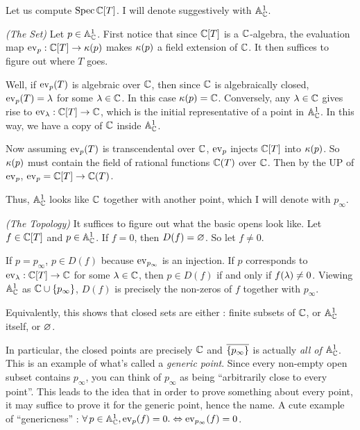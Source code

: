 \begin{eg}
  
  Let us compute $\operatorname{Spec} \mathbb{C}[T]$.
  I will denote suggestively with $\mathbb{A}^1_{\mathbb{C}}$.

  \textit{(The Set)}
  Let $p \in \mathbb{A}^1_{\mathbb{C}}$.
  First notice that since $\mathbb{C}[T]$ is a $\mathbb{C}$-algebra,
  the evaluation map $\operatorname{ev}_p : \mathbb{C}[T] \to \kappa(p)$
  makes $\kappa(p)$ a field extension of $\mathbb{C}$.
  It then suffices to figure out where $T$ goes. 

  Well, if $\operatorname{ev}_p(T)$ is algebraic over $\mathbb{C}$,
  then since $\mathbb{C}$ is algebraically closed, 
  $\operatorname{ev}_p(T) = \lambda$ for some $\lambda \in \mathbb{C}$.
  In this case $\kappa(p) = \mathbb{C}$.
  Conversely, any $\lambda \in \mathbb{C}$ gives rise to 
  $\operatorname{ev}_\lambda : \mathbb{C}[T] \to \mathbb{C}$, which is the initial representative of 
  a point in $\mathbb{A}^1_{\mathbb{C}}$.
  In this way, we have a copy of $\mathbb{C}$ inside $\mathbb{A}^1_{\mathbb{C}}$.

  Now assuming $\operatorname{ev}_p(T)$ is transcendental over $\mathbb{C}$,
  $\operatorname{ev}_p$ injects $\mathbb{C}[T]$ into $\kappa(p)$.
  So $\kappa(p)$ must contain the field of rational functions $\mathbb{C}(T)$ over $\mathbb{C}$.
  Then by the UP of $\operatorname{ev}_p$, $\operatorname{ev}_p = \mathbb{C}[T] \to \mathbb{C}(T)$.

  Thus, $\mathbb{A}^1_{\mathbb{C}}$ looks like 
  $\mathbb{C}$ together with another point, which I will denote with $p_\infty$.

  \textit{(The Topology)}
  It suffices to figure out what the basic opens look like.
  Let $f \in \mathbb{C}[T]$ and $p \in \mathbb{A}^1_{\mathbb{C}}$.
  If $f = 0$, then $D(f) = \varnothing$.
  So let $f \neq 0$.

  If $p = p_\infty$, $p \in D(f)$ because $\operatorname{ev}_{p_\infty}$ is an injection.
  If $p$ corresponds to $\operatorname{ev}_\lambda : \mathbb{C}[T] \to \mathbb{C}$ for some $\lambda \in \mathbb{C}$,
  then $p \in D(f)$ if and only if $f(\lambda) \neq 0$.
  Viewing $\mathbb{A}^1_{\mathbb{C}}$ as $\mathbb{C} \cup \left\{p_\infty\right\}$,
  $D(f)$ is precisely the non-zeros of $f$ together with $p_\infty$.

  Equivalently, this shows that 
  closed sets are either :
  finite subsets of $\mathbb{C}$, 
  or $\mathbb{A}^1_{\mathbb{C}}$ itself, or $\varnothing$.

  In particular, the closed points are precisely $\mathbb{C}$
  and $\overline{\left\{p_\infty\right\}}$ is actually \emph{all of $\mathbb{A}^1_{\mathbb{C}}$}. 
  This is an example of what's called a \emph{generic point}.
  Since every non-empty open subset contains $p_\infty$,
  you can think of $p_\infty$ as being ``arbitrarily close to every point''.
  This leads to the idea that in order to prove something about 
  every point, 
  it may suffice to prove it for the generic point,
  hence the name.
  A cute example of ``genericness'' : 
  $\forall\, p \in \mathbb{A}^1_{\mathbb{C}}, \operatorname{ev}_p(f) = 0. 
  \Leftrightarrow \operatorname{ev}_{p_\infty}(f) = 0$.


\end{eg}
